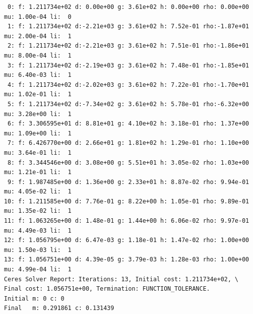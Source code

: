 \begin{verbatim}
 0: f: 1.211734e+02 d: 0.00e+00 g: 3.61e+02 h: 0.00e+00 rho: 0.00e+00 mu: 1.00e-04 li:  0
 1: f: 1.211734e+02 d:-2.21e+03 g: 3.61e+02 h: 7.52e-01 rho:-1.87e+01 mu: 2.00e-04 li:  1
 2: f: 1.211734e+02 d:-2.21e+03 g: 3.61e+02 h: 7.51e-01 rho:-1.86e+01 mu: 8.00e-04 li:  1
 3: f: 1.211734e+02 d:-2.19e+03 g: 3.61e+02 h: 7.48e-01 rho:-1.85e+01 mu: 6.40e-03 li:  1
 4: f: 1.211734e+02 d:-2.02e+03 g: 3.61e+02 h: 7.22e-01 rho:-1.70e+01 mu: 1.02e-01 li:  1
 5: f: 1.211734e+02 d:-7.34e+02 g: 3.61e+02 h: 5.78e-01 rho:-6.32e+00 mu: 3.28e+00 li:  1
 6: f: 3.306595e+01 d: 8.81e+01 g: 4.10e+02 h: 3.18e-01 rho: 1.37e+00 mu: 1.09e+00 li:  1
 7: f: 6.426770e+00 d: 2.66e+01 g: 1.81e+02 h: 1.29e-01 rho: 1.10e+00 mu: 3.64e-01 li:  1
 8: f: 3.344546e+00 d: 3.08e+00 g: 5.51e+01 h: 3.05e-02 rho: 1.03e+00 mu: 1.21e-01 li:  1
 9: f: 1.987485e+00 d: 1.36e+00 g: 2.33e+01 h: 8.87e-02 rho: 9.94e-01 mu: 4.05e-02 li:  1
10: f: 1.211585e+00 d: 7.76e-01 g: 8.22e+00 h: 1.05e-01 rho: 9.89e-01 mu: 1.35e-02 li:  1
11: f: 1.063265e+00 d: 1.48e-01 g: 1.44e+00 h: 6.06e-02 rho: 9.97e-01 mu: 4.49e-03 li:  1
12: f: 1.056795e+00 d: 6.47e-03 g: 1.18e-01 h: 1.47e-02 rho: 1.00e+00 mu: 1.50e-03 li:  1
13: f: 1.056751e+00 d: 4.39e-05 g: 3.79e-03 h: 1.28e-03 rho: 1.00e+00 mu: 4.99e-04 li:  1
Ceres Solver Report: Iterations: 13, Initial cost: 1.211734e+02, \
Final cost: 1.056751e+00, Termination: FUNCTION_TOLERANCE.
Initial m: 0 c: 0
Final   m: 0.291861 c: 0.131439
\end{verbatim}

